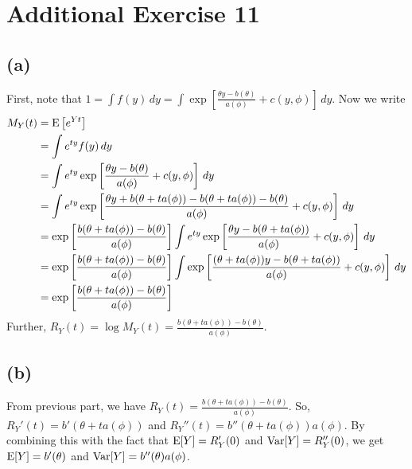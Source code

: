 \section*{Additional Exercise 11}

\subsection*{(a)}
First, note that $1 = \int f(y) \,dy = \int\exp\left[\frac{\theta y - b(\theta)}{a(\phi)} + c(y,\phi)\right] \,dy$. Now we write
\begin{align*}
M_{Y}(t) &= \mathrm{E}\left[e^{Yt}\right]\\
&= \int e^{ty} f(y)\,dy\\
&= \int e^{ty} \exp\left[\frac{\theta y - b(\theta)}{a(\phi)} + c(y,\phi)\right] \,dy\\
&= \int e^{ty} \exp\left[\frac{\theta y +b(\theta +ta(\phi)) -b(\theta +ta(\phi)) - b(\theta)}{a(\phi)} + c(y,\phi)\right] \,dy\\
&= \exp\left[ \frac{b(\theta +ta(\phi)) -b(\theta)}{a(\phi)} \right]\int e^{ty} \exp\left[\frac{\theta y -b(\theta +ta(\phi))}{a(\phi)} + c(y,\phi)\right] \,dy\\
&= \exp\left[ \frac{b(\theta +ta(\phi)) -b(\theta)}{a(\phi)} \right]\int \exp\left[\frac{(\theta + ta(\phi))y -b(\theta +ta(\phi))}{a(\phi)} + c(y,\phi)\right] \,dy\\
&= \exp\left[\frac{b(\theta + t a(\phi)) -b(\theta)}{a(\phi)}\right]
\end{align*}
Further, $R_{Y}(t) = \log M_{Y}(t) = \frac{b(\theta + t a(\phi)) -b(\theta)}{a(\phi)}$.\\

\subsection*{(b)}
From previous part, we have $R_{Y}(t) =\frac{b(\theta + t a(\phi)) -b(\theta)}{a(\phi)}$.
So, $R_{Y}'(t) = b'(\theta + t a(\phi))$ and $R_{Y}''(t) = b''(\theta + t a(\phi)) a(\phi)$. By combining this with the fact that $\mathrm{E}[Y] = R_{Y}'(0)$ and $\mathrm{Var}[Y] = R_{Y}''(0)$, we get $\mathrm{E}[Y] = b'(\theta)$ and  $\mathrm{Var}[Y] = b''(\theta) a(\phi)$.
